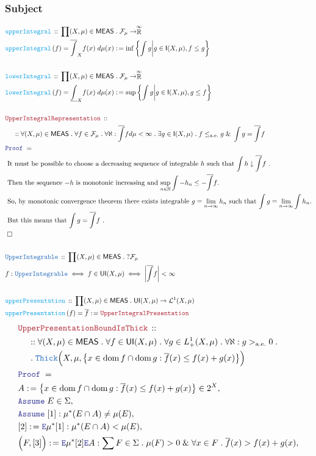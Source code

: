 \documentclass[12pt]{scrartcl}
\newcommand{\TYPE}[1]{\textcolor{NavyBlue}{\mathtt{#1}}}
\newcommand{\FUNC}[1]{\textcolor{Cerulean}{\mathtt{#1}}}
\newcommand{\LOGIC}[1]{\textcolor{Blue}{\mathtt{#1}}}
\newcommand{\THM}[1]{\textcolor{Maroon}{\mathtt{#1}}}
\renewcommand{\.}{\; . \;}
\newcommand{\de}{: \kern 0.1pc =}
\newcommand{\Act}[1]{\left( #1 \right)}
\newcommand{\Theorem}[2]{& \THM{#1} \, :: \, #2 \\ & \Proof = \\ }
\newcommand{\DeclareType}[2]{& \TYPE{#1} \, :: \, #2 \\}
\newcommand{\DefineNamedType}[4]{& #1 : \TYPE{#2} \iff #3 \iff #4 \\}
\newcommand{\DeclareFunc}[2]{& \FUNC{#1} \, :: \, #2 \\}
\newcommand{\DefineNamedFunc}[4]{&  \FUNC{#1}\Act{#2} = #3 \de #4 \\}
\newcommand{\NewLine}{\\ & \kern 1pc}
\newcommand{\Page}[1]{ \begin{align*} #1 \end{align*}   }
\renewcommand{\And}{\; \& \;}
\newcommand{\Elim}{\LOGIC{E}}
\newcommand{\Nat}{\mathbb{N} }
\newcommand{\EReals}{\stackrel{\mathclap{\infty}}{\mathbb{R}}}
\newcommand{\Say}[3]{& #1 \de #2 : #3, \\}
\newcommand{\SayIn}[3]{& #1 \de #2 \in #3, \\}
\newcommand{\Assume}[2]{& \LOGIC{Assume} \; #1 : #2, \\}
\newcommand{\AssumeIn}[2]{& \LOGIC{Assume} \; #1 \in #2, \\}
\newcommand{\QED}{\; \square}
\newcommand{\EndProof}{& \QED \\}
\newcommand{\Proof}{\LOGIC{Proof} \; }
\newcommand{\Explain}[1]{& \text{#1.} \\}
\DeclareMathOperator*{\dom}{dom}
\renewcommand{\L}{\mathcal{L}}
\renewcommand{\L}{\mathcal{L}}
\renewcommand{\ae}{\mathrm{a.e.}}
\newcommand{\Integrable}{\mathsf{I}}
\newcommand{\F}{\mathcal{F}}
\newcommand{\MEAS}{\mathsf{MEAS}}
\begin{document}
\subsubsection{Subject}
\Page{
	\DeclareFunc{upperIntegral}
	{
		\prod (X,\mu) \in \MEAS \. \F_\mu \to \EReals
	}
	\DefineNamedFunc{upperIntegral}{f}{\overline{\int}_X f(x) \; d\mu(x)}
	{
		\inf \left\{ \int g \bigg| g \in \Integrable(X,\mu), f \le g \right\}
	}
	\\
	\DeclareFunc{lowerIntegral}
	{
		\prod (X,\mu) \in \MEAS \. \F_\mu \to \EReals
	}
	\DefineNamedFunc{lowerIntegral}{f}{\underline{\int}_X f(x) \; d\mu(x)}
	{
		\sup \left\{ \int g \bigg| g \in \Integrable(X,\mu), g \le f \right\}
	}
	\\
	\Theorem{UpperIntegralRepresentation}
	{
		\NewLine ::		
		\forall (X,\mu) \in \MEAS\.
		\forall f \in \F_\mu \.
		\forall \aleph : \overline{\int}f  d\mu < \infty \.
		\exists g \in \Integrable(X,\mu) \.
		f \le_{\ae} g \And \int g  = \overline{\int} f 
	}
	\Explain{ 
		It must be possible to choose a decreasing sequence of integrable $h$ such that
		$\int h \downarrow \overline{\int} f $ }
	\Explain{ 
		Then the sequence $-h$ is monotonic increasing and 
		$\sup_{n \in \Nat} \int -h_n \le -\overline{\int} f $}
	\Explain{
		So, by monotonic convergence theorem there exists integrable $g = \lim_{n \to \infty} h_n$
		such that $\int g = \lim_{n \to \infty}\int h_n$}
	\Explain{
		But this means that $\int g = \overline{\int} f  $
	}
	\EndProof
	\\
	\DeclareType{UpperIntegrable}{ \prod (X,\mu) \in \MEAS \. ?\F_\mu }
	\DefineNamedType{f}{UpperIntegrable}{f \in \mathsf{UI}(X,\mu)}{\left| \overline{\int} f \right| < \infty}
	\\
	\DeclareFunc{upperPresentation}{ \prod (X,\mu) \in \MEAS \. \mathsf{UI}(X,\mu) \to \L^1(X,\mu) }
	\DefineNamedFunc{upperPresentation}{f}{\overline{f}}{\THM{UpperIntegralPresentation}}
}\Page{
	\Theorem{UpperPresentationBoundIsThick}
	{
		\NewLine ::		
		\forall (X,\mu) \in \MEAS \.
		\forall f \in \mathsf{UI}(X,\mu) \.
		\forall g \in L^1_+(X,\mu) \.
		\forall \aleph : g >_{\ae} 0 \. \NewLine \.
		\TYPE{Thick}\Big( X, \mu, \big\{ x \in \dom f \cap \dom g : \overline{f}(x) \le f(x) + g(x)  \big\}  \Big)
	}
	\SayIn{A}{\big\{ x \in \dom f \cap \dom g : \overline{f}(x) \le f(x) + g(x)  \big\} }{2^X}
	\AssumeIn{E}{\Sigma}
	\Assume{[1]}{\mu^*(E \cap A) \neq \mu(E)}
	\Say{[2]}{\Elim \mu^* [1]}{ \mu^*(E \cap A) < \mu(E)}
	\Say{\Big(F,[3]\Big)}{\Elim \mu^* [2] \Elim A}
	{
		\sum F \in \Sigma \. \mu(F) > 0 \And \forall x \in F \. \overline{f}(x) > f(x) + g(x)
}}
\end{document}
